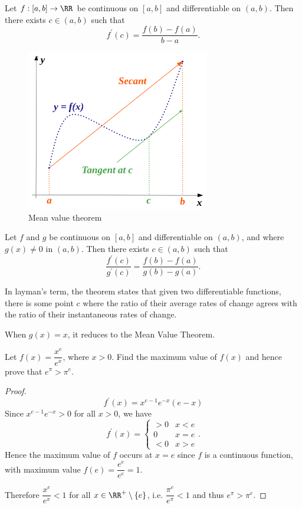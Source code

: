 \begin{theorem}
Let $f:[a,b]\to\RR$ be continuous on $[a,b]$ and differentiable on $(a,b)$. Then there exists $c\in(a,b)$ such that 
\[ f^\prime(c)=\frac{f(b)-f(a)}{b-a}. \]
\end{theorem}

\begin{figure}[H]
    \centering
    \includegraphics[width=8cm]{images/mean_value_thrm.png}
    \caption{Mean value theorem}
\end{figure}

\begin{theorem}
Let $f$ and $g$ be continuous on $[a,b]$ and differentiable on $(a,b)$, and where $g(x)\neq0$ in $(a,b)$. Then there exists $c\in(a,b)$ such that
\[ \frac{f^\prime(c)}{g^\prime(c)}=\frac{f(b)-f(a)}{g(b)-g(a)}. \]
\end{theorem}

In layman's term, the theorem states that given two differentiable functions, there is some point $c$ where the ratio of their average rates of change agrees with the ratio of their instantaneous rates of change.

\begin{remark}
When $g(x)=x$, it reduces to the Mean Value Theorem.
\end{remark}

\begin{exercise}{}{}
Let $f(x)=\dfrac{x^e}{e^x}$, where $x>0$. Find the maximum value of $f(x)$ and hence prove that $e^\pi>\pi^e$.
\end{exercise}

\begin{proof}
\[ f^\prime(x)=x^{e-1}e^{-x}(e-x) \]
Since $x^{e-1}e^{-x}>0$ for all $x>0$, we have
\[ f^\prime(x)=\begin{cases}
>0 & x<e\\
0 & x=e\\
<0 & x>e
\end{cases}. \]
Hence the maximum value of $f$ occurs at $x=e$ since $f$ is a continuous function, with maximum value $f(e)=\dfrac{e^e}{e^e}=1$.

Therefore $\dfrac{x^e}{e^x}<1$ for all $x\in\RR^+\setminus\{e\}$, i.e. $\dfrac{\pi^e}{e^\pi}<1$ and thus $e^\pi>\pi^e$.
\end{proof}

